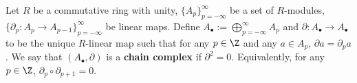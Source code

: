 \begin{definition}
  Let
    $R$ be a commutative ring with unity,
    $\{A_p\}_{p = -\infty}^\infty$ be a set of $R$-modules,
    $\{\partial_p \colon A_p \to A_{p - 1}\}_{p = -\infty}^\infty$ be linear
      maps.
  Define
    $A_\bullet := \bigoplus_{p = -\infty}^\infty A_p$ and
    $\partial \colon A_\bullet \to A_\bullet$ to be the unique $R$-linear map
      such that for any $p \in \Z$ and any $a \in A_p$,
      $\partial a = \partial_p a$.
  We say that $(A_\bullet, \partial)$ is a \textbf{chain complex} if
  $\partial^2 = 0$.
  Equivalently, for any $p \in \Z$, $\partial_p \circ \partial_{p + 1} = 0$.
\end{definition}
